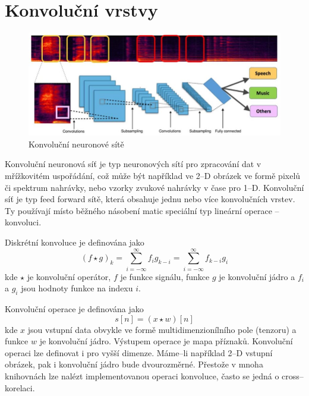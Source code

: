 \section{Konvoluční vrstvy}
\begin{figure}[H]
    \centering
    \includegraphics[scale=0.5]{obrazky-figures/conv_nn_audio.jpg}
    \caption{\label{fig:conv_nn}Konvoluční neuronové sítě}
\end{figure}
Konvoluční neuronová síť  je typ neuronových sítí pro zpracování dat v mřížkovitém uspořádání, což může být například ve 2--D obrázek ve formě pixelů či spektrum nahrávky, nebo vzorky zvukové nahrávky v čase pro 1--D. Konvoluční síť je typ feed forward sítě, která obsahuje jednu nebo více konvolučních vrstev. Ty používají místo běžného násobení matic speciální typ lineární operace -- konvoluci. 


Diskrétní konvoluce je definována jako
\begin{equation}
   (f \star g)_k = \sum_{i=-\infty}^{\infty} f_i g_{k-i} = \sum_{i=-\infty}^{\infty} f_{k-i} g_{i}
\end{equation}
kde $\star$ je konvoluční operátor, $f$ je funkce signálu, funkce $g$ je konvoluční jádro a $f_i$ a $g_i$ jsou hodnoty funkce na indexu $i$.


Konvoluční operace je definována jako
\begin{equation}
   s[n] = (x \star w)[n]
\end{equation}
kde $x$ jsou vstupní data obvykle ve formě multidimenzionílního pole (tenzoru) a funkce $w$ je konvoluční jádro. Výstupem operace je mapa příznaků. Konvoluční operaci lze definovat i pro vyšší dimenze. Máme--li například 2--D vstupní obrázek, pak i konvoluční jádro bude dvourozměrné. Přestože v mnoha knihovnách lze nalézt implementovanou operaci konvoluce, často se jedná o cross--korelaci.


